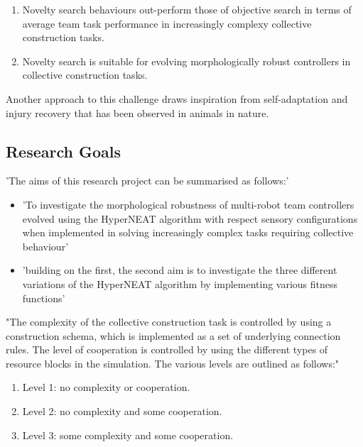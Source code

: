 {\begin{enumerate}
	\item Novelty search behaviours out-perform those of objective search in terms of average team task performance in increasingly complexy collective construction tasks.
	\item Novelty search is suitable for evolving morphologically robust controllers in collective construction tasks.
\end{enumerate}


Another approach to this challenge draws inspiration from self-adaptation and injury recovery that has been observed in animals in nature.






\subsection{Research Goals}

'The aims of this research project can be summarised as follows:'
\begin{itemize}
	\item 'To investigate the morphological robustness of multi-robot team controllers evolved using the HyperNEAT algorithm with respect sensory configurations when implemented in solving increasingly complex tasks requiring collective behaviour'
	\item 'building on the first, the second aim is to investigate the three different variations of the HyperNEAT algorithm by implementing various fitness functions'
\end{itemize}

"The complexity of the collective construction task is controlled by using a construction schema, which is implemented as a set of underlying connection rules. The level of cooperation is controlled by using the different types of resource blocks in the simulation.
The various levels are outlined as follows:"
\begin{enumerate}
	\item Level 1: no complexity or cooperation.
	\item Level 2: no complexity and some cooperation.
	\item Level 3: some complexity and some cooperation.
\end{enumerate}

}
